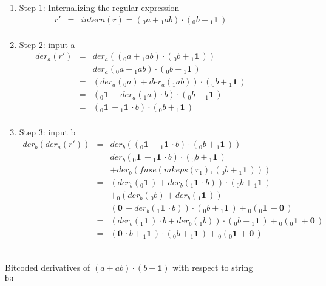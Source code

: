 \documentclass[12pt]{article}
\newcommand{\ZERO}{\textbf{0}}
\newcommand{\ONE}{\textbf{1}}
\newcommand{\der}{\textit{der}}
\newcommand{\fuse}{\textit{fuse}}
\newcommand{\mkeps}{\textit{mkeps}}
\newcommand{\intern}{\textit{intern}}
\begin{document}
\begin{figure}[ht]
  \begin{center}
    \begin{enumerate}
      \item Step 1: Internalizing the regular expression
      \[
      \begin{array}{rcl}
      r' & = & \intern(r) = ({}_0a + {}_1ab) \cdot ({}_0b + {}_1\ONE\,)\\
      \end{array}
      \]
      \item Step 2: input a
      \[
      \begin{array}{rcl}
      \der_a (r') & =           & \der_a(({}_0a + {}_1ab) \cdot ({}_0b + {}_1\ONE\,))\\
                & =           & \der_a({}_0a + {}_1ab) \cdot ({}_0b + {}_1\ONE\,)\\
                & =           & (\der_a({}_0a) + \der_a({}_1ab)) \cdot ({}_0b + {}_1\ONE\,)\\
                & =           & ({}_0\ONE\, + \der_a({}_1a) \cdot b ) \cdot ({}_0b + {}_1\ONE\,)\\
                & = & ({}_0\ONE\, + {}_1\ONE\, \cdot b) \cdot ({}_0b + {}_1\ONE\,)\\
      \end{array}
      \]
      \item Step 3: input b
      \[
      \begin{array}{rcl}
      \der_b(\der_a(r')) & =           & \der_b(({}_0\ONE\, + {}_1\ONE\, \cdot b) \cdot ({}_0b + {}_1\ONE\,))\\
                      & =           & \der_b({}_0\ONE\, + {}_1\ONE\, \cdot b) \cdot ({}_0b + {}_1\ONE\,) \\
                      &             &+ \der_b(\fuse(\mkeps(r_1),({}_0b + {}_1\ONE\,))) \\
                      & =           & (\der_b({}_0\ONE\,) + \der_b({}_1\ONE\, \cdot b)) \cdot ({}_0b + {}_1\ONE\,) \\
                      &&+ {}_0(\der_b({}_0b) + \der_b({}_1\ONE\,)) \\
                      & =           & (\ZERO\, + \der_b({}_1\ONE\, \cdot b)) \cdot ({}_0b + {}_1\ONE\,) + {}_0({}_0\ONE\, + \ZERO\,) \\
                      & =           & (\der_b({}_1\ONE\,)\cdot b + \der_b({}_1b)) \cdot ({}_0b + {}_1\ONE\,) + {}_0({}_0\ONE\, + \ZERO\,) \\
                      & = & (\ZERO\, \cdot b + {}_1\ONE\,) \cdot ({}_0b + {}_1\ONE\,) + {}_0({}_0\ONE\, + \ZERO\,) \\
      \end{array}
      \]
    \end{enumerate}
  \mbox{}
  \rule{\linewidth}{0.4pt}
  \caption{Bitcoded derivatives of $(a+ab)\cdot (b+\ONE)$ with respect to string \texttt{ba}} \label{BitcodedDerivative}
  \end{center}
\end{figure}
\end{document}
